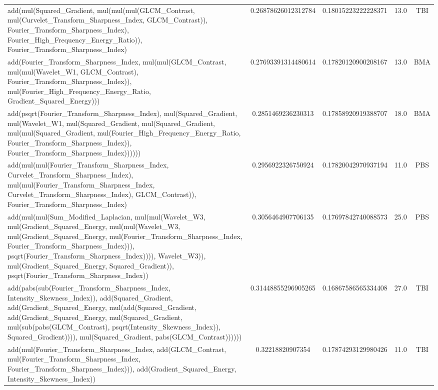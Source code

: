 \begin{table}[t]
\begin{tabular}{lcccc}
add(mul(Squared\_Gradient, mul(mul(mul(GLCM\_Contrast, mul(Curvelet\_Transform\_Sharpness\_Index, GLCM\_Contrast)), Fourier\_Transform\_Sharpness\_Index), Fourier\_High\_Frequency\_Energy\_Ratio)), Fourier\_Transform\_Sharpness\_Index) & 0.26878626012312784 & 0.18015223222228371 & 13.0 & TBI \\
add(Fourier\_Transform\_Sharpness\_Index, mul(mul(GLCM\_Contrast, mul(mul(Wavelet\_W1, GLCM\_Contrast), Fourier\_Transform\_Sharpness\_Index)), mul(Fourier\_High\_Frequency\_Energy\_Ratio, Gradient\_Squared\_Energy))) & 0.27693391314480614 & 0.17820120900208167 & 13.0 & BMA \\
add(psqrt(Fourier\_Transform\_Sharpness\_Index), mul(Squared\_Gradient, mul(Wavelet\_W1, mul(Squared\_Gradient, mul(Squared\_Gradient, mul(mul(Squared\_Gradient, mul(Fourier\_High\_Frequency\_Energy\_Ratio, Fourier\_Transform\_Sharpness\_Index)), Fourier\_Transform\_Sharpness\_Index)))))) & 0.2851469236230313 & 0.17858920919388707 & 18.0 & BMA \\
add(mul(mul(Fourier\_Transform\_Sharpness\_Index, Curvelet\_Transform\_Sharpness\_Index), mul(mul(Fourier\_Transform\_Sharpness\_Index, Curvelet\_Transform\_Sharpness\_Index), GLCM\_Contrast)), Fourier\_Transform\_Sharpness\_Index) & 0.2956922326750924 & 0.17820042970937194 & 11.0 & PBS \\
add(mul(mul(Sum\_Modified\_Laplacian, mul(mul(Wavelet\_W3, mul(Gradient\_Squared\_Energy, mul(mul(Wavelet\_W3, mul(Gradient\_Squared\_Energy, mul(Fourier\_Transform\_Sharpness\_Index, Fourier\_Transform\_Sharpness\_Index))), psqrt(Fourier\_Transform\_Sharpness\_Index)))), Wavelet\_W3)), mul(Gradient\_Squared\_Energy, Squared\_Gradient)), psqrt(Fourier\_Transform\_Sharpness\_Index)) & 0.3056464907706135 & 0.17697842740088573 & 25.0 & PBS \\
add(pabs(sub(Fourier\_Transform\_Sharpness\_Index, Intensity\_Skewness\_Index)), add(Squared\_Gradient, add(Gradient\_Squared\_Energy, mul(add(Squared\_Gradient, add(Gradient\_Squared\_Energy, mul(Squared\_Gradient, mul(sub(pabs(GLCM\_Contrast), psqrt(Intensity\_Skewness\_Index)), Squared\_Gradient)))), mul(Squared\_Gradient, pabs(GLCM\_Contrast)))))) & 0.31448855296905265 & 0.16867586565334408 & 27.0 & TBI \\
add(mul(Fourier\_Transform\_Sharpness\_Index, add(GLCM\_Contrast, mul(Fourier\_Transform\_Sharpness\_Index, Fourier\_Transform\_Sharpness\_Index))), add(Gradient\_Squared\_Energy, Intensity\_Skewness\_Index)) & 0.32218820907354 & 0.17874293129980426 & 11.0 & TBI \\
\hline
\end{tabular}
\end{table}